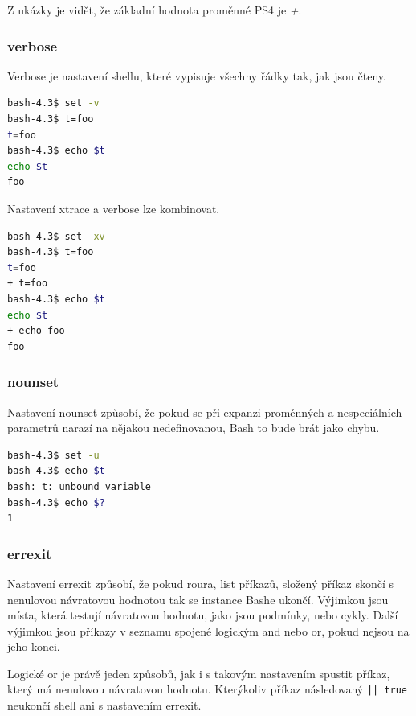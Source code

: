 \documentclass[thesis=M,czech]{FITthesis}[2012/06/26]
\begin{document}
Z ukázky je vidět, že základní hodnota proměnné PS4 je \textit{+}.

\subsubsection{verbose}

Verbose je nastavení shellu, které vypisuje všechny řádky tak, jak jsou čteny.

\begin{lstlisting}[language=bash, caption={Výstup z knihovny Bashlex}, label={lst:bashlex}]
bash-4.3$ set -v
bash-4.3$ t=foo
t=foo
bash-4.3$ echo $t
echo $t
foo
\end{lstlisting}

Nastavení xtrace a verbose lze kombinovat.

\begin{lstlisting}[language=bash, caption={Výstup z knihovny Bashlex}, label={lst:bashlex}]
bash-4.3$ set -xv
bash-4.3$ t=foo
t=foo
+ t=foo
bash-4.3$ echo $t
echo $t
+ echo foo
foo
\end{lstlisting}


\subsubsection{nounset}

Nastavení nounset způsobí, že pokud se při expanzi proměnných a nespeciálních parametrů narazí na nějakou nedefinovanou, Bash to bude brát jako chybu.

\begin{lstlisting}[language=bash, caption={nounset}, label={lst:unbound}]
bash-4.3$ set -u
bash-4.3$ echo $t
bash: t: unbound variable
bash-4.3$ echo $?
1
\end{lstlisting}


\subsubsection{errexit}

Nastavení errexit způsobí, že pokud roura, list příkazů, složený příkaz skončí s nenulovou návratovou hodnotou tak se instance Bashe ukončí. Výjimkou jsou místa, která testují návratovou hodnotu, jako jsou podmínky, nebo cykly. Další výjimkou jsou příkazy v seznamu spojené logickým and nebo or, pokud nejsou na jeho konci.

Logické or je právě jeden způsobů, jak i s takovým nastavením spustit příkaz, který má nenulovou návratovou hodnotu. Kterýkoliv příkaz následovaný \texttt{|| true} neukončí shell ani s nastavením errexit.
\end{document}
